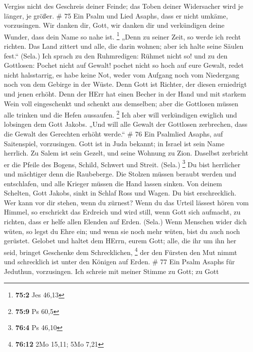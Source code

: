 Vergiss nicht des Geschreis deiner Feinde; das Toben deiner Widersacher
wird je länger, je größer. \# 75  Ein Psalm und Lied Asaphs,
dass er nicht umkäme, vorzusingen.  Wir danken dir, Gott,
wir danken dir und verkündigen deine Wunder, dass dein Name so nahe ist.
\footnote{\textbf{75:2} Jes 46,13}  „Denn zu seiner Zeit, so
werde ich recht richten.  Das Land zittert und alle, die
darin wohnen; aber ich halte seine Säulen fest.`` (Sela.) 
Ich sprach zu den Ruhmredigen: Rühmet nicht so! und zu den Gottlosen:
Pochet nicht auf Gewalt!  pochet nicht so hoch auf eure
Gewalt, redet nicht halsstarrig,  es habe keine Not, weder
vom Aufgang noch vom Niedergang noch von dem Gebirge in der Wüste.
 Denn Gott ist Richter, der diesen erniedrigt und jenen
erhöht.  Denn der HErr hat einen Becher in der Hand und mit
starkem Wein voll eingeschenkt und schenkt aus demselben; aber die
Gottlosen müssen alle trinken und die Hefen aussaufen. \footnote{\textbf{75:9}
  Ps 60,5}  Ich aber will verkündigen ewiglich und
lobsingen dem Gott Jakobs.  „Und will alle Gewalt der
Gottlosen zerbrechen, dass die Gewalt des Gerechten erhöht werde.`` \#
76  Ein Psalmlied Asaphs, auf Saitenspiel, vorzusingen.
 Gott ist in Juda bekannt; in Israel ist sein Name herrlich.
 Zu Salem ist sein Gezelt, und seine Wohnung zu Zion.
 Daselbst zerbricht er die Pfeile des Bogens, Schild,
Schwert und Streit. (Sela.) \footnote{\textbf{76:4} Ps 46,10}
 Du bist herrlicher und mächtiger denn die Raubeberge.
 Die Stolzen müssen beraubt werden und entschlafen, und alle
Krieger müssen die Hand lassen sinken.  Von deinem Schelten,
Gott Jakobs, sinkt in Schlaf Ross und Wagen.  Du bist
erschrecklich. Wer kann vor dir stehen, wenn du zürnest? 
Wenn du das Urteil lässest hören vom Himmel, so erschrickt das Erdreich
und wird still,  wenn Gott sich aufmacht, zu richten, dass
er helfe allen Elenden auf Erden. (Sela.)  Wenn Menschen
wider dich wüten, so legst du Ehre ein; und wenn sie noch mehr wüten,
bist du auch noch gerüstet.  Gelobet und haltet dem HErrn,
eurem Gott; alle, die ihr um ihn her seid, bringet Geschenke dem
Schrecklichen, \footnote{\textbf{76:12} 2Mo 15,11; 5Mo 7,21}
 der den Fürsten den Mut nimmt und schrecklich ist unter
den Königen auf Erden. \# 77  Ein Psalm Asaphs für Jeduthun,
vorzusingen.  Ich schreie mit meiner Stimme zu Gott; zu Gott
